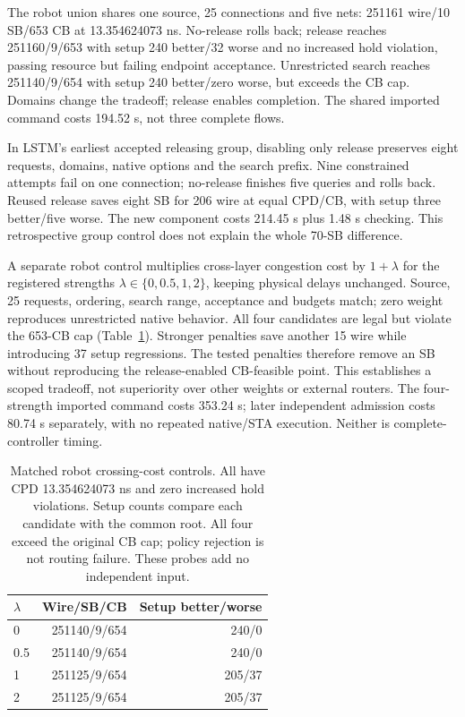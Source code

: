 \documentclass[conference,10pt]{IEEEtran}
\begin{document}
The robot union shares one source, 25 connections and five nets: 251161 wire/10 SB/653 CB at 13.354624073 ns. No-release rolls back; release reaches 251160/9/653 with setup 240 better/32 worse and no increased hold violation, passing resource but failing endpoint acceptance. Unrestricted search reaches 251140/9/654 with setup 240 better/zero worse, but exceeds the CB cap. Domains change the tradeoff; release enables completion. The shared imported command costs 194.52 s, not three complete flows.

In LSTM's earliest accepted releasing group, disabling only release preserves eight requests, domains, native options and the search prefix. Nine constrained attempts fail on one connection; no-release finishes five queries and rolls back. Reused release saves eight SB for 206 wire at equal CPD/CB, with setup three better/five worse. The new component costs 214.45 s plus 1.48 s checking. This retrospective group control does not explain the whole 70-SB difference.

A separate robot control multiplies cross-layer congestion cost by $1+\lambda$ for the registered strengths $\lambda\in\{0,0.5,1,2\}$, keeping physical delays unchanged. Source, 25 requests, ordering, search range, acceptance and budgets match; zero weight reproduces unrestricted native behavior. All four candidates are legal but violate the 653-CB cap (Table~\ref{tab:costcontrol}). Stronger penalties save another 15 wire while introducing 37 setup regressions. The tested penalties therefore remove an SB without reproducing the release-enabled CB-feasible point. This establishes a scoped tradeoff, not superiority over other weights or external routers. The four-strength imported command costs 353.24 s; later independent admission costs 80.74 s separately, with no repeated native/STA execution. Neither is complete-controller timing.

\begin{table}[t]
\centering\footnotesize\setlength{\tabcolsep}{4pt}
\caption{Matched robot crossing-cost controls. All have CPD 13.354624073 ns and zero increased hold violations. Setup counts compare each candidate with the common root. All four exceed the original CB cap; policy rejection is not routing failure. These probes add no independent input.}
\label{tab:costcontrol}
\begin{tabular}{lrr}\hline
$\lambda$ & Wire/SB/CB & Setup better/worse\\\hline
0 & 251140/9/654 & 240/0\\
0.5 & 251140/9/654 & 240/0\\
1 & 251125/9/654 & 205/37\\
2 & 251125/9/654 & 205/37\\\hline
\end{tabular}
\end{table}
\end{document}
